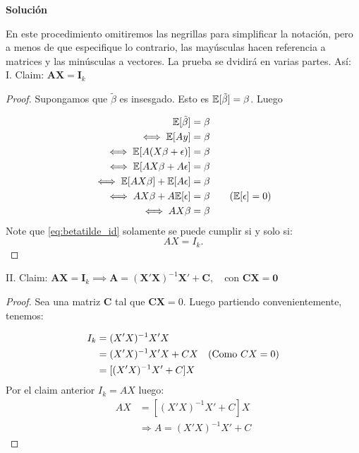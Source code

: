 \documentclass[a4paper, answers, addpoints, 11pt]{exam}
\newenvironment{solucion}{%
  \begin{mdframed}[
    backgroundcolor=blue!5,    %
    linecolor=blue!50,          %
    linewidth=2pt,              %
    leftmargin=10pt,            %
    rightmargin=8pt,           %
    topline=true,              %
    bottomline=true,            %
    roundcorner=10pt,           %
    innerleftmargin=10pt,       %
    innerrightmargin=10pt,      %
    innerbottommargin=10pt,     %
    innertopmargin=10pt         %
  ]%
  \begin{tcolorbox}[colframe=blue!50!black, colback=blue!50, coltitle=white, sharp corners=all, boxrule=1mm, width=\textwidth, halign=left, valign=center, top=0mm, bottom=0mm, left=0mm, right=0mm] \textbf{Solución} \end{tcolorbox} }{\end{mdframed}}
\begin{document}
\begin{solucion}

En este procedimiento omitiremos las negrillas para simplificar la notación, pero a menos de que especifique lo contrario, las mayúsculas hacen referencia a matrices y las minúsculas a vectores. La prueba se dvidirá en varias partes. Así:\\

I. Claim: \(\mathbf{A}\mathbf{X} = \mathbf{I}_k\)
\begin{proof}
    Supongamos que $\tilde{\beta}$ es insesgado. Esto es $ \mathbb{E}[\tilde{\beta}] = \beta \notag$. Luego 

    \begin{align}
         \mathbb{E}[\tilde{\beta}] &= \beta \notag\\
         \iff
        \mathbb{E}[Ay] &= \beta  \notag \\
         \iff\mathbb{E}[A(X\beta+\epsilon)] &= \beta \notag \\ 
         \iff\mathbb{E}[AX\beta+A\epsilon] &= \beta  \notag\\
         \iff\mathbb{E}[AX\beta]+\mathbb{E}[A\epsilon] &= \beta  \notag\\
         \iff AX\beta+A\mathbb{E}[\epsilon] &=   \beta  \qquad (\mathbb{E}[\epsilon]=0) \notag \\
        \iff AX\beta&=\beta \label{eq:betatilde_id}
    \end{align}
   Note que \ref{eq:betatilde_id} solamente se puede cumplir si y solo si: 
   $$
   AX = I_k.
   $$
\end{proof}

II. Claim: \(\mathbf{A}\mathbf{X} = \mathbf{I}_k \implies  \mathbf{A} = (\mathbf{X}'\mathbf{X})^{-1}\mathbf{X}' + \mathbf{C}, \quad \text{con } \mathbf{C}\mathbf{X} = \mathbf{0}\)
\begin{proof}
Sea una matriz $\mathbf{C}$ tal que $\mathbf{C}\mathbf{X}=0$. Luego partiendo convenientemente, tenemos:

 \begin{align*}
 I_k  &=(X'X)^{-1}X'X\notag \\
 &= (X'X)^{-1}X'X + CX \quad \text{(Como $CX=0$)}\notag \\
        &= [(X'X)^{-1}X' + C]X \notag \\
\end{align*}
Por el claim anterior $I_k=A X$ luego:
\begin{align*}
        A X &=[(X'X)^{-1}X' + C]X \\
       &\Rightarrow A=(X'X)^{-1}X'+C
  \end{align*}
  \end{proof}
 


\end{solucion}
\end{document}
